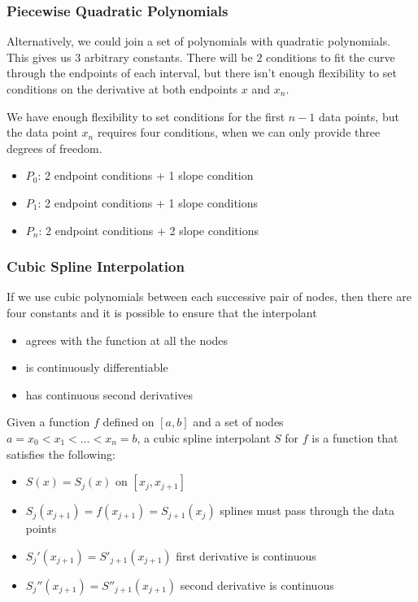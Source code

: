\subsubsection{Piecewise Quadratic Polynomials}

Alternatively, we could join a set of polynomials with quadratic polynomials.
This gives us $3$ arbitrary constants. There will be $2$ conditions to fit the
curve through the endpoints of each interval, but there isn't enough flexibility
to set conditions on the derivative at both endpoints $x$ and $x_n$.

We have enough flexibility to set conditions for the first $n-1$ data points,
but the data point $x_n$ requires four conditions, when we can only provide
three degrees of freedom.

\begin{itemize}
\item $P_0$: 2 endpoint conditions + 1 slope condition
\item $P_1$: 2 endpoint conditions + 1 slope conditions
\item $P_n$: 2 endpoint conditions + 2 slope conditions
\end{itemize}

\subsubsection{Cubic Spline Interpolation}

If we use cubic polynomials between each successive pair of nodes, then there
are four constants and it is possible to ensure that the interpolant

\begin{itemize}
  \item agrees with the function at all the nodes
  \item is continuously differentiable
  \item has continuous second derivatives
\end{itemize}

Given a function $f$ defined on $[a, b]$ and a set of nodes
$a=x_0<x_1<\dots<x_n=b$, a cubic spline interpolant $S$ for $f$ is a function
that satisfies the following:

\begin{itemize}
  \item $S(x) = S_j(x)$ on $[x_j, x_{j+1}]$
  \item $S_j(x_{j+1}) = f(x_{j+1}) = S_{j+1}(x_j)$ splines must pass through the
    data points
  \item $S_j'(x_{j+1}) = S'_{j+1}(x_{j+1})$ first derivative is continuous
  \item $S_j''(x_{j+1}) = S''_{j+1}(x_{j+1})$ second derivative is continuous
\end{itemize}

